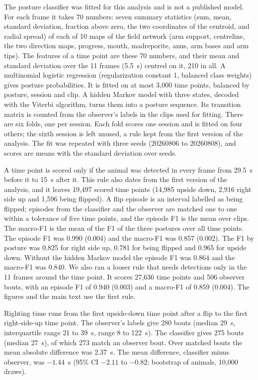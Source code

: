 The posture classifier was fitted for this analysis and is not a published model.
For each frame it takes 70 numbers: seven summary statistics (sum, mean, standard deviation, fraction above zero, the two coordinates of the centroid, and radial spread) of each of 10 maps of the field network (arm support, centreline, the two direction maps, progress, mouth, madreporite, anus, arm bases and arm tips).
The features of a time point are these 70 numbers, and their mean and standard deviation over the 11 frames (5.5~s) centred on it, 210 in all.
A multinomial logistic regression (regularization constant 1, balanced class weights) gives posture probabilities.
It is fitted on at most 3,000 time points, balanced by posture, session and clip.
A hidden Markov model with three states, decoded with the Viterbi algorithm, turns them into a posture sequence.
Its transition matrix is counted from the observer's labels in the clips used for fitting.
There are six folds, one per session.
Each fold scores one session and is fitted on four others; the sixth session is left unused, a rule kept from the first version of the analysis.
The fit was repeated with three seeds (20260806 to 20260808), and scores are means with the standard deviation over seeds.

A time point is scored only if the animal was detected in every frame from 29.5~s before it to 15~s after it.
This rule also dates from the first version of the analysis, and it leaves 19,497 scored time points (14,985 upside down, 2,916 right side up and 1,596 being flipped).
A flip episode is an interval labelled as being flipped; episodes from the classifier and the observer are matched one to one within a tolerance of five time points, and the episode F1 is the mean over clips.
The macro-F1 is the mean of the F1 of the three postures over all time points.
The episode F1 was 0.990 (0.004) and the macro-F1 was 0.857 (0.002).
The F1 by posture was 0.825 for right side up, 0.781 for being flipped and 0.965 for upside down.
Without the hidden Markov model the episode F1 was 0.864 and the macro-F1 was 0.840.
We also ran a looser rule that needs detections only in the 11 frames around the time point.
It scores 27,636 time points and 506 observer bouts, with an episode F1 of 0.940 (0.003) and a macro-F1 of 0.859 (0.004).
The figures and the main text use the first rule.

Righting time runs from the first upside-down time point after a flip to the first right-side-up time point.
The observer's labels give 280 bouts (median 29~s, interquartile range 21 to 39~s, range 8 to 122~s).
The classifier gives 275 bouts (median 27~s), of which 273 match an observer bout.
Over matched bouts the mean absolute difference was 2.37~s.
The mean difference, classifier minus observer, was $-1.44$~s (95\% CI $-2.11$ to $-0.82$; bootstrap of animals, 10,000 draws).

